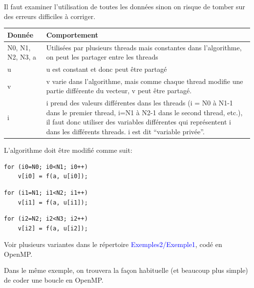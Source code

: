 \documentclass{beamer}
\begin{document}
\begin{frame}[fragile]
Il faut examiner l'utilisation de toutes les données sinon on risque de tomber sur des erreurs difficiles à corriger.

\vfill
\begin{tabular}{|l|l|}
	 \hline
	\bf Donnée & \bf Comportement \\
	 \hline
	 \begin{minipage}[t]{0.20\textwidth}
	 	N0, N1, N2, N3, a 
	\end{minipage}
 & \begin{minipage}[t]{0.78\textwidth}
	 	Utilisées par plusieurs threads mais constantes dans l'algorithme, on peut les partager entre les threads
 	\end{minipage}
 	 \\[25pt]
	 \hline
	 u &  \begin{minipage}[t]{0.75\textwidth}
	 	u est constant et donc peut être partagé\end{minipage}
	 \\[10pt]
	 \hline
	 v &  \begin{minipage}[t]{0.75\textwidth}
	 	v varie dans l'algorithme, mais comme chaque thread modifie une partie différente du vecteur, v peut être partagé.\end{minipage}
	 \\[20pt]
	 \hline
	 i &  \begin{minipage}[t]{0.75\textwidth}
	 	i prend des valeurs différentes dans les threads (i = N0 à N1-1 dans le premier thread, i=N1 à N2-1 dans le second thread, etc.), il faut donc utiliser des variables différentes qui représentent i dans les différents threads. i est dit ``variable privée''.\end{minipage}
	 \\[30pt]
	 \hline
\end{tabular}

\end{frame}

\begin{frame}[fragile]
	L'algorithme doit être modifié comme suit:
	
\begin{lstlisting}
for (i0=N0; i0<N1; i0++)
	v[i0] = f(a, u[i0]);
\end{lstlisting}

\begin{lstlisting}
for (i1=N1; i1<N2; i1++)
	v[i1] = f(a, u[i1]);
\end{lstlisting}

\begin{lstlisting}
for (i2=N2; i2<N3; i2++)
	v[i2] = f(a, u[i2]);
\end{lstlisting}
\vfill

Voir plusieurs variantes dans le répertoire \textcolor{blue}{Exemples2/Exemple1}, codé en OpenMP.

\vfill
Dans le même exemple, on trouvera la façon habituelle (et beaucoup plus simple) de coder une boucle en OpenMP.
\end{frame}
\end{document}
